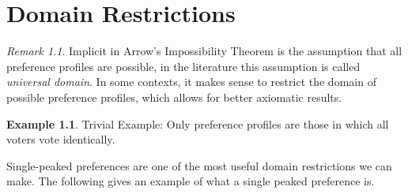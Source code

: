 \documentclass{book}
\theoremstyle{plain}
\theoremstyle{definition}
\newtheorem{example}[theorem]{Example}
\theoremstyle{remark}
\newtheorem{remark}[theorem]{Remark}
\begin{document}
\chapter{Domain Restrictions}

\begin{remark}
    Implicit in Arrow's Impossibility Theorem 
    is the assumption that all preference profiles are possible,
    in the literature this assumption is called 
    \emph{universal domain}.
    In some contexts, it makes sense 
    to restrict the domain of possible preference profiles,
    which allows for better axiomatic results.
\end{remark}
\begin{example}
    Trivial Example: Only preference profiles are those in 
    which all voters vote identically.
\end{example}

Single-peaked preferences are one of the most useful
domain restrictions we can make. The following gives an
example of what a single peaked preference is.
\end{document}
